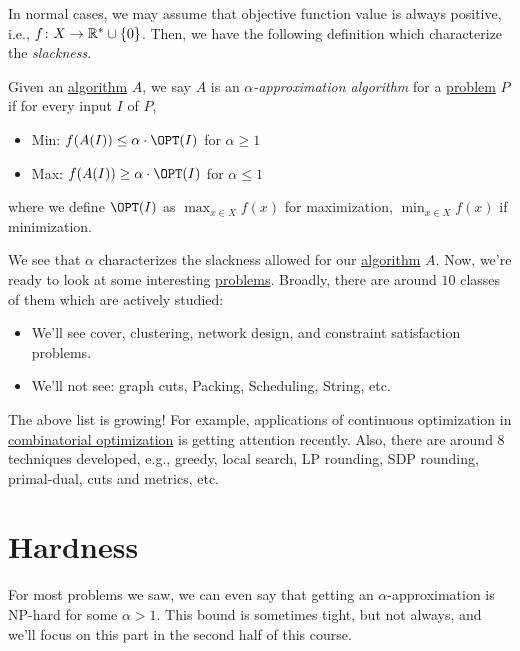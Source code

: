In normal cases, we may assume that objective function value is always positive, i.e., \(f\colon X \to \mathbb{\MakeUppercase{r}} ^* \cup \left\{ 0 \right\} \). Then, we have the following definition which characterize the \emph{slackness}.

\begin{definition}\label{def:approximation-algorithm}
	Given an \hyperref[def:algorithm]{algorithm} \(A\), we say \(A\) is an \emph{\(\alpha\)-approximation algorithm} for a \hyperref[def:computational-problem]{problem} \(P\) if for every input \(I\) of \(P\),
	\begin{itemize}
		\item Min: \(f(A(I)) \leq \alpha \cdot \OPT (I)\) for \(\alpha \geq 1\)
		\item Max: \(f(A(I)) \geq \alpha \cdot \OPT (I)\) for \(\alpha \leq 1\)
	\end{itemize}
	where we define \(\OPT(I)\) as \(\max _{x\in X}f(x)\) for maximization, \(\min _{x\in X}f(x)\) if minimization.
\end{definition}

We see that \(\alpha \) characterizes the slackness allowed for our \hyperref[def:algorithm]{algorithm} \(A\). Now, we're ready to look at some interesting \hyperref[def:combinatorial-optimization]{problems}. Broadly, there are around \(10\) classes of them which are actively studied:

\begin{itemize}
	\item We'll see cover, clustering, network design, and constraint satisfaction problems.
	\item We'll not see: graph cuts, Packing, Scheduling, String, etc.
\end{itemize}

The above list is growing! For example, applications of continuous optimization in \hyperref[def:combinatorial-optimization]{combinatorial optimization} is getting attention recently. Also, there are around \(8\) techniques developed, e.g., greedy, local search, LP rounding, SDP rounding, primal-dual, cuts and metrics, etc.

\section{Hardness}

For most problems we saw, we can even say that getting an \(\alpha\)-approximation is \textsc{NP}-hard for some \(\alpha > 1\). This bound is sometimes tight, but not always, and we'll focus on this part in the second half of this course.

